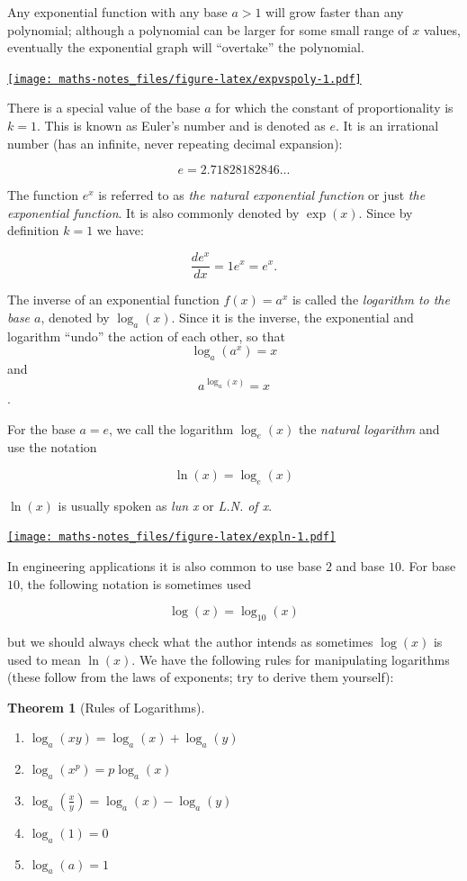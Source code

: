 \documentclass[
]{book}
\providecommand{\tightlist}{%
  \setlength{\itemsep}{0pt}\setlength{\parskip}{0pt}}
\newtheorem{theorem}{Theorem}[chapter]
\theoremstyle{definition}
\theoremstyle{definition}
\theoremstyle{definition}
\theoremstyle{definition}
\theoremstyle{remark}
\begin{document}
Any exponential function with any base \(a>1\) will grow faster than any polynomial; although a polynomial can be larger for some small range of \(x\) values, eventually the exponential graph will ``overtake'' the polynomial.

\href{https://www.desmos.com/calculator/g22ec0pwpq}{\texttt{[image: maths-notes\_files/figure-latex/expvspoly-1.pdf]}}

There is a special value of the base \(a\) for which the constant of proportionality is \(k=1\). This is known as Euler's number and is denoted as \(e\). It is an irrational number (has an infinite, never repeating decimal expansion):

\[e=2.71828182846...\]

The function \(e^x\) is referred to as \emph{the natural exponential function} or just \emph{the exponential function}. It is also commonly denoted by \(\exp(x)\). Since by definition \(k=1\) we have:

\[\frac{de^x}{dx}=1e^x=e^x.\]

The inverse of an exponential function \(f(x)=a^x\) is called the \emph{logarithm to the base \(a\)}, denoted by \(\log_a(x)\). Since it is the inverse, the exponential and logarithm ``undo'' the action of each other, so that
\[\log_a(a^x)=x\]
and
\[a^{\log_a(x)}=x\].

For the base \(a=e\), we call the logarithm \(\log_e(x)\) the \emph{natural logarithm} and use the notation

\[\ln(x)=\log_e(x)\]

\(\ln(x)\) is usually spoken as \emph{lun x} or \emph{L.N. of x}.

\href{https://www.desmos.com/calculator/wlp8muzfqk}{\texttt{[image: maths-notes\_files/figure-latex/expln-1.pdf]}}

In engineering applications it is also common to use base \(2\) and base \(10\). For base \(10\), the following notation is sometimes used

\[\log(x)=\log_{10}(x)\]

but we should always check what the author intends as sometimes \(\log(x)\) is used to mean \(\ln(x)\). We have the following rules for manipulating logarithms (these follow from the laws of exponents; try to derive them yourself):

\begin{theorem}[Rules of Logarithms]
\protect\hypertarget{thm:logrules}{}\label{thm:logrules}

\begin{enumerate}
\def\labelenumi{\arabic{enumi}.}
\tightlist
\item
  \(\log_a(xy)=\log_a(x)+\log_a(y)\)
\item
  \(\log_a(x^p)=p\log_a(x)\)
\item
  \(\log_a(\frac{x}{y})=\log_a(x)-\log_a(y)\)
\item
  \(\log_a(1)=0\)
\item
  \(\log_a(a)=1\)
\end{enumerate}

\end{theorem}
\end{document}
